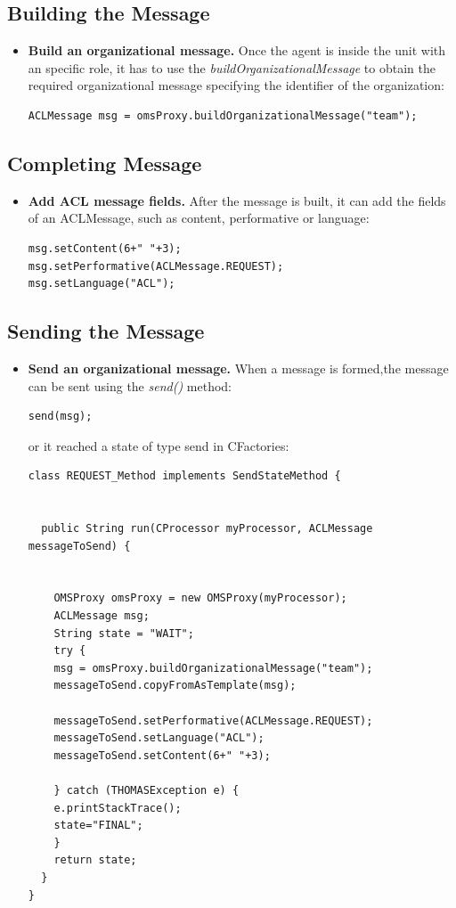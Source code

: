 \subsection{Building the Message}
\begin{itemize}
\item \textbf{Build an organizational message.} Once the agent is inside the unit with an specific role, it has to use the \textit{buildOrganizationalMessage} to
obtain the required organizational message specifying the identifier of the organization:
\begin{lstlisting}
ACLMessage msg = omsProxy.buildOrganizationalMessage("team");
\end{lstlisting}
\end{itemize}

\subsection{Completing Message}
\begin{itemize}
\item \textbf{Add ACL message fields.} After the message is built, it can add the fields of an ACLMessage, such as content, performative or language:
\begin{lstlisting}
msg.setContent(6+" "+3);
msg.setPerformative(ACLMessage.REQUEST);
msg.setLanguage("ACL");
\end{lstlisting}
\end{itemize}
\subsection{Sending the Message}
\begin{itemize}
\item \textbf{Send an organizational message.} When a message is formed,the message can be sent  using the \textit{send()} method:

\begin{lstlisting}
send(msg);
\end{lstlisting}
or it reached a state of type send in CFactories:
\begin{lstlisting}
class REQUEST_Method implements SendStateMethod {


  public String run(CProcessor myProcessor, ACLMessage messageToSend) {


    OMSProxy omsProxy = new OMSProxy(myProcessor);
    ACLMessage msg;
    String state = "WAIT";
    try {
	msg = omsProxy.buildOrganizationalMessage("team");
	messageToSend.copyFromAsTemplate(msg);

	messageToSend.setPerformative(ACLMessage.REQUEST);
	messageToSend.setLanguage("ACL");
	messageToSend.setContent(6+" "+3);

    } catch (THOMASException e) {
	e.printStackTrace();
	state="FINAL";
    }
    return state;
  }
}
\end{lstlisting}
\end{itemize}

